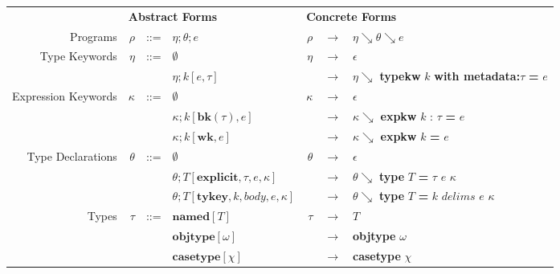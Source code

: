 \documentclass{sig-alternate}
\makeatletter
\newcommand\BeraMonottfamily{%
  \def\fvm@Scale{0.85}%
  \fontfamily{fvm}\selectfont%
}
\newcommand{\textcd}[1]{\textbf{\scriptsize\BeraMonottfamily{#1}}}
\makeatother
\begin{document}
\begin{figure*}
\begin{center}
\begin{tabular}{ r r l l r c l}
  & \multicolumn{3}{l}{\textbf{Abstract Forms}} & \multicolumn{3}{l}{\textbf{Concrete Forms}}\\
  Programs            & $\rho$            & ::= &  $\eta;\theta;e$                  & $\rho$    & $\rightarrow$ & $\eta\searrow\theta\searrow e$\\
  Type Keywords       & $\eta$            & ::= &  $\emptyset$                      & $\eta$    & $\rightarrow$ & $\epsilon$\\
                      &                   &     &  $\eta;k[e,\tau]$                 &           & $\rightarrow$ & $\eta\searrow$ \textcd{typekw} $k$ \textcd{with metadata:}$\tau$ \textcd{=} $e$  \\
  Expression Keywords & $\kappa$          & ::= &  $\emptyset$                      & $\kappa$  & $\rightarrow$ & $\epsilon$\\
                      &                   &     &  $\kappa;k[\mathbf{bk}(\tau),e]$  &           & $\rightarrow$ & $\kappa\searrow$ \textcd{expkw} $k$ : $\tau$ \textcd{=} $e$\\
                      &                   &     &  $\kappa;k[\mathbf{wk},e]$        &           & $\rightarrow$ & $\kappa\searrow$ \textcd{expkw} $k$ \textcd{=} $e$\\
  Type Declarations   & $\theta$          & ::= &  $\emptyset$                      & $\theta$  & $\rightarrow$ & $\epsilon$\\
                      &                   &     &  $\theta; T[\mathbf{explicit},\tau, e, \kappa]$     &           & $\rightarrow$ & $\theta\searrow$ \textcd{type} $T$ \textcd{=} $\tau$ $e$ $\kappa$\\
                      &                   &     &  $\theta; T[\mathbf{tykey},k, body, e, \kappa]$  &           & $\rightarrow$ & $\theta\searrow$ \textcd{type} $T$ \textcd{=} $k$ $delims$ $e$ $\kappa$\\
  Types               & $\tau$            & ::= &  $\mathbf{named}[T]$              & $\tau$    & $\rightarrow$ & $T$\\
                      &                   &     &  $\mathbf{objtype}[\omega]$       &           & $\rightarrow$ & \textcd{objtype} $\omega$ \\
                      &                   &     &  $\mathbf{casetype}[\chi]$        &           & $\rightarrow$ & \textcd{casetype} $\chi$\\

\end{tabular}
\end{center}
\end{figure*}
\end{document}
